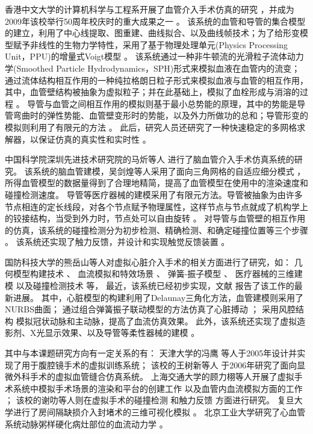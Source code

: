 香港中文大学的计算机科学与工程系开展了血管介入手术仿真的研究 \cite{guo2007CUHK,Chui2010CUHK,Li2011CUHK,Li2012CUHK}，并成为2009年该校举行50周年校庆时的重大成果之一 \cite{cuhkweb}。%
该系统的血管和导管的集合模型的建立，利用了中心线提取、图重建、曲线拟合、以及曲线帧技术；为了给形变模型赋予非线性的生物力学特性，采用了基于物理处理单元(Physics Processing Unit，PPU)的增量式Voigt模型 \cite{guo2007CUHK}。%
该系统通过一种非牛顿流的光滑粒子流体动力学(Smoothed Particle Hydrodynamics，SPH)形式来模拟血液在血管内的流变；通过流体结构相互作用的一种纯拉格朗日粒子形式来模拟血液与血管的相互作用，其中，血管壁结构被抽象为虚拟粒子；并在此基础上，模拟了血栓形成与消溶的过程 \cite{Chui2010CUHK}。%
导管与血管之间相互作用的模拟则基于最小总势能的原理，其中的势能是导管弯曲时的弹性势能、血管壁变形时的势能，以及外力所做功的总和；导管形变的模拟则利用了有限元的方法 \cite{Li2011CUHK}。%
此后，研究人员还研究了一种快速稳定的多网格求解器，以保证仿真的真实性和实时性 \cite{Li2012CUHK}。

中国科学院深圳先进技术研究院的马炘等人 \cite{Ma2010SIAT,Ma2010aSIAT}进行了脑血管介入手术仿真系统的研究。
该系统的脑血管建模，吴剑煌等人采用了面向三角网格的自适应细分模式 \cite{Ma2010bSIAT,Wu2006SIAT}，所得血管模型的数据量得到了合理地精简，提高了血管模型在使用中的渲染速度和碰撞检测速度。%
导管等医疗器械的建模采用了有限元方法。导管被抽象为由许多节点相连的定长线段，对各个节点赋予物理属性，这样节点与节点就成了机构学上的铰接结构，当受到外力时，节点处可以自由旋转 \cite{Ma2010SIAT}。%
对导管与血管壁的相互作用的仿真，该系统的碰撞检测分为初步检测、精确检测、和确定碰撞位置等三个步骤 \cite{Ma2010SIAT}。
该系统还实现了触力反馈，并设计和实现触觉反馈装置 \cite{Ma2010SIAT}。

国防科技大学的熊岳山等人对虚拟心脏介入手术的相关方面进行了研究，如：
几何模型构建技术 \cite{han2005master}、
血流模拟和特效场景 \cite{ren2005master,Ren2006NUDT}、
弹簧-振子模型 \cite{wang2006master,Wang2008NUDT}、
医疗器械的三维建模 \cite{zhu2007master}
以及碰撞检测技术 \cite{kang2007master}等，
最近，该系统已经初步实现，文献 \cite{Tan2012NUDT}报告了该工作的最新进展。
其中，心脏模型的构建利用了Delaunay三角化方法，血管建模则采用了NURBS曲面；
通过组合弹簧振子联动模型的方法仿真了心脏搏动 \cite{Wang2008NUDT}；
采用风腔结构 \cite{Ren2006NUDT}模拟冠状动脉和主动脉，提高了血流仿真效果。
此外，该系统还实现了虚拟造影剂、X光显示效果、以及导管等柔性器械的建模 \cite{Tan2012NUDT}。

其中与本课题研究方向有一定关系的有：
天津大学的冯鹰 \cite{li2005master}等人于2005年设计并实现了用于腹腔镜手术的虚拟训练系统；
该校的王树新等人 \cite{zeng2006master}于2006年研究了面向显微外科手术的虚拟血管缝合仿真系统。
上海交通大学的顾力栩等人开展了虚拟手术系统中模拟手术场景的渲染和平台的创建工作 \cite{zheng2008master}以及血管内血流模拟方面的工作 \cite{huang2011virtual}；
该校的谢叻等人则在虚拟手术的碰撞检测 \cite{wu2010virtual}和触力反馈 \cite{wu2011virtual}方面进行研究。
复旦大学进行了房间隔缺损介入封堵术的三维可视化模拟 \cite{Zhao2006Fudan}。
北京工业大学研究了心血管系统动脉粥样硬化病灶部位的血流动力学 \cite{Huang2003BJUT}。